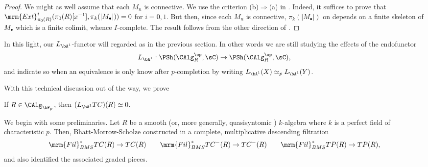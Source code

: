 \documentclass[a4paper,10pt]{amsart}
\begin{document}
\begin{proof} We might as well assume that each $M_n$ is connective. We use the criterion (b)$\Rightarrow$(a) in \cite[Theorem 7.3.4.1]{SAG}. Indeed, it suffices to prove that $\mrm{Ext}^i_{\pi_0(R)}(\pi_0(R)[x^{-1}], \pi_k(|M_{\bullet}|)) = 0$ for $i = 0,1$. But then, since each $M_n$ is connective, $\pi_k(|M_{\bullet}|)$ on depends on a finite skeleton of $M_{\bullet}$ which is a finite colimit, whence $I$-complete. The result follows from the other direction of \cite[Theorem 7.3.4.1]{SAG}.
\end{proof}
%
%

In this light, our $L_{\bA^1}$-functor will regarded as in the previous section. In other words we are still studying the effects of the endofunctor
\[
L_{\bA^1}: \PSh(\CAlg_R^{\op},\sC) \rightarrow \PSh(\CAlg_R^{\op},\sC),
\]
and indicate so when an equivalence is only know after $p$-completion by writing $L_{\bA^1}(X) \simeq_{p} L_{\bA^1}(Y)$.

%

 With this technical discussion out of the way, we prove

\begin{thm} \label{thm:tc-zero} If $R \in \CAlg_{\bF_p}$, then $(L_{\bA^1}TC)(R) \simeq 0$.
\end{thm}

We begin with some preliminaries. Let $R$ be a smooth (or, more generally, quasisyntomic \cite[Definition 4.10]{BMS2}) $k$-algebra where $k$ is a perfect field of characteristic $p$. Then, Bhatt-Morrow-Scholze constructed in \cite{BMS2} a complete, multiplicative descending filtration 
\begin{equation} \label{eq:tp}
\mrm{Fil}_{BMS}^{\ast}TC(R) \rightarrow TC(R) \qquad \mrm{Fil}_{BMS}^{\ast}TC^-(R) \rightarrow TC^-(R) \qquad \mrm{Fil}_{BMS}^{\ast}TP(R) \rightarrow TP(R),
\end{equation} 
and also identified the associated graded pieces. 
\end{document}
